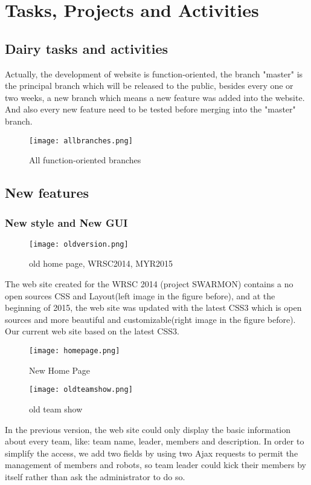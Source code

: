 \section{Tasks, Projects and Activities}
\subsection{Dairy tasks and activities}
Actually, the development of website is function-oriented, the branch "master" is the principal branch which will be released to the public, besides every one or two weeks, a new branch which means a new feature was added into the website. And also every new feature need to be tested before merging into the "master" branch.

\begin{figure}[h!]
    \centering
    \texttt{[image: allbranches.png]}
    \caption{All function-oriented branches }
    \label{fig-sample}
\end{figure}

\subsection{New features}
\subsubsection{New style and New GUI}
\begin{figure}[h!]
\centering
\texttt{[image: oldversion.png]}
\caption{old home page, WRSC2014, MYR2015 }
\label{fig-sample}
\end{figure}
The web site created for the WRSC 2014 (project SWARMON) contains a no open sources CSS and Layout(left image in the figure before), and at the beginning of 2015, the web site was updated with the latest CSS3 which is open sources and more beautiful and customizable(right image in the figure before). Our current web site based on the latest CSS3.
\begin{figure}[h!]
\centering
\texttt{[image: homepage.png]}
\caption{New Home Page }
\end{figure}

\begin{figure}[h!]
\centering
\texttt{[image: oldteamshow.png]}
\caption{old team show}
\label{fig-sample}
\end{figure}
In the previous version, the web site could only display the basic information about every team, like: team name, leader, members and description. In order to simplify the access, we add two fields by using two Ajax requests to permit the management of members and robots, so team leader could kick their members by itself rather than ask the administrator to do so. 

